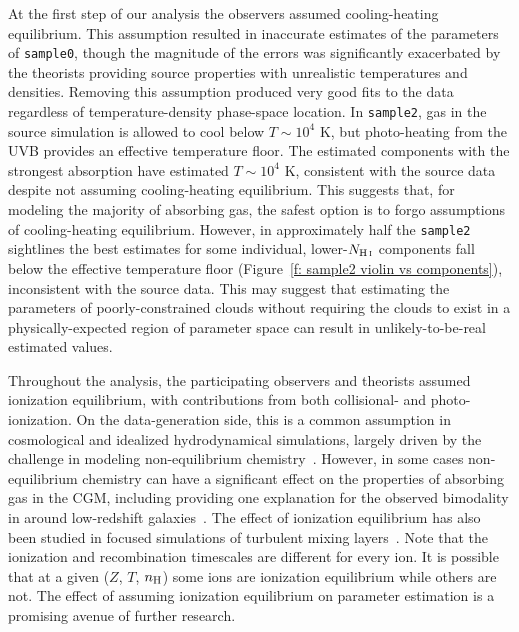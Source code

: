 \documentclass[fleqn,usenatbib]{mnras}
\begin{document}
At the first step of our analysis the observers assumed cooling-heating equilibrium.
This assumption resulted in inaccurate estimates of the parameters of \texttt{sample0}, though the magnitude of the errors was significantly exacerbated by the theorists providing source properties with unrealistic temperatures and densities.
Removing this assumption produced very good fits to the data regardless of temperature-density phase-space location.
In \texttt{sample2}, gas in the source simulation is allowed to cool below $T \sim 10^4$ K,
but photo-heating from the UVB provides an effective temperature floor.
The estimated components with the strongest absorption have estimated $T \sim 10^4$ K,
consistent with the source data despite not assuming cooling-heating equilibrium.
This suggests that, for modeling the majority of absorbing gas, the safest option is to forgo assumptions of cooling-heating equilibrium.
However, in approximately half the \texttt{sample2} sightlines the best estimates for some individual, lower-$N_{\ion{H}{I}}$ components fall below the effective temperature floor (Figure~\ref{f: sample2 violin vs components}),
inconsistent with the source data.
This may suggest that estimating the parameters of poorly-constrained clouds without requiring the clouds to exist in a physically-expected region of parameter space can result in unlikely-to-be-real estimated values.

Throughout the analysis, the participating observers and theorists assumed ionization equilibrium, with contributions from both collisional- and photo-ionization.
On the data-generation side, this is a common assumption in cosmological and idealized hydrodynamical simulations, largely driven by the challenge in modeling non-equilibrium chemistry~\citep[e.g.][]{richings2014Nonequilibrium}.
However, in some cases non-equilibrium chemistry can have a significant effect on the properties of absorbing gas in the CGM, including providing one explanation for the observed bimodality in  around low-redshift galaxies~\citep{oppenheimer2016Bimodality}.
The effect of ionization equilibrium has also been studied in focused simulations of turbulent mixing layers~\citep[e.g.][]{ji2019Simulations}.
Note that the ionization and recombination timescales are different for every ion.
It is possible that at a given ($Z$, $T$, $n_{\rm H}$) some ions are ionization equilibrium while others are not.
The effect of assuming ionization equilibrium on parameter estimation is a promising avenue of further research.
\end{document}
